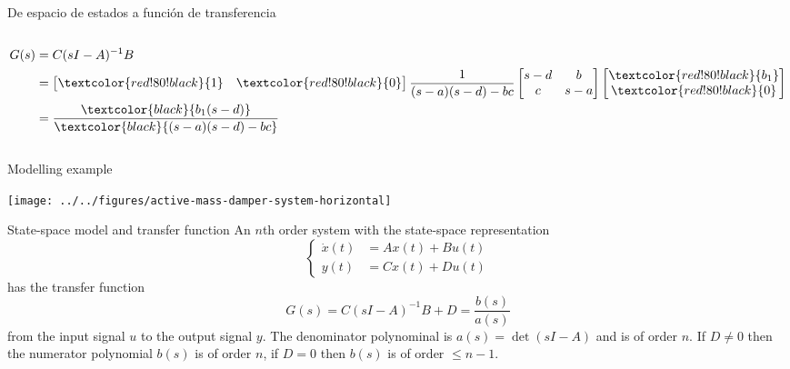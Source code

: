 \documentclass[presentation,aspectratio=1610]{beamer}
\begin{document}
\begin{frame}[label={sec:org1f3246f}]{De espacio de estados a función de transferencia}
\begin{columns}
\begin{column}{0.5\columnwidth}
\begin{align*}
G(s) &= C(sI-A)^{-1}B\\
     &= \begin{bmatrix} \textcolor{red!80!black}{1} &  \textcolor{red!80!black}{0}\end{bmatrix} \frac{1}{(s-a)(s-d) - bc} \begin{bmatrix} s-d & b\\c & s-a \end{bmatrix} \begin{bmatrix} \textcolor{red!80!black}{b_1} \\ \textcolor{red!80!black}{0} \end{bmatrix}\\
    &=  \frac{\textcolor{black}{b_1(s-d)}}{\textcolor{black}{(s-a)(s-d) - bc}}
\end{align*}
\end{column}
\end{columns}
\end{frame}

\begin{frame}[label={sec:orgaa1ff81}]{Modelling example}
\begin{center}
\texttt{[image: ../../figures/active-mass-damper-system-horizontal]}
\end{center}
\end{frame}

\begin{frame}[label={sec:org82aa529}]{State-space model and transfer function}
An \(n\)th order system with the state-space representation
\begin{equation}
\begin{cases}
\dot{x}(t)&=Ax(t)+Bu(t)\\ y(t)&=Cx(t)+Du(t)
\end{cases}\tag{$*$}
\end{equation}
has the transfer function
\begin{equation*}
G(s)=C(sI-A)^{-1}B+D=\frac{b(s)}{a(s)}
\end{equation*}
from the input signal \(u\) to the output signal \(y\). The denominator polynominal is
\(a(s)=\det(sI-A)\) and is of order \(n\). If \(D\neq0\) then the numerator polynomial \(b(s)\) is of order \(n\), if \(D=0\) then \(b(s)\) is of order \(\le n-1\).
\end{frame}
\end{document}
